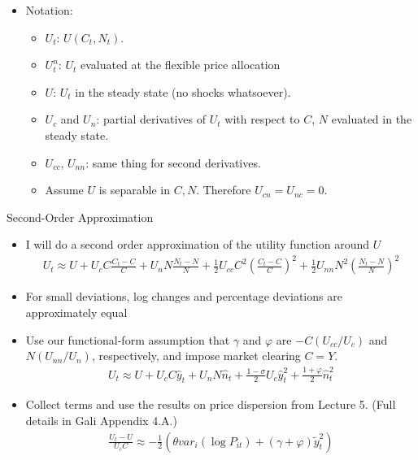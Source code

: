\documentclass[11pt,aspectratio=169,xcolor={dvipsnames},hyperref={pdftex,pdfpagemode=UseNone,hidelinks,pdfdisplaydoctitle=true},usepdftitle=false]{beamer}
\begin{document}
\begin{frame}
\begin{itemize}
\item Notation:
\begin{itemize}
\item $U_t$: $U(C_t,N_t)$.
\item $U_t^n$: $U_t$ evaluated at the flexible price allocation
\item $U$: $U_t$ in the steady state (no shocks whatsoever).
\item $U_c$ and $U_n$: partial derivatives of $U_t$ with respect to $C$, $N$ evaluated in the steady state. 
\item $U_{cc}$, $U_{nn}$: same thing for second derivatives.
\item Assume $U$ is separable in $C,N$. Therefore $U_{cn} = U_{nc} = 0$.
\end{itemize}
\end{itemize}
\end{frame}


\begin{frame}{Second-Order Approximation}
\begin{itemize}
\item I will do a second order approximation of the utility function around $U$
\begin{align*}
U_t \approx U + U_c C \frac{C_t - C}{C} + U_n N \frac{N_t - N}{N} + \frac{1}{2} U_{cc} C^2 \left(\frac{C_t - C}{C}\right)^2 + \frac{1}{2} U_{nn} N^2 \left(\frac{N_t - N}{N}\right)^2 
\end{align*}
\item For small deviations, log changes and percentage deviations are approximately equal
\item Use our functional-form assumption that $\gamma$ and $\varphi$ are $-C (U_{cc}/U_c)$ and $N (U_{nn}/U_n)$, respectively, and impose market clearing $C = Y$.
\begin{align*}
U_t \approx U + U_c C \hat{y}_t + U_n N \hat{n}_t + \frac{1-\sigma}{2} U_{c}  \hat{y}^2_t + \frac{1+\varphi}{2} \hat{n}^2_t
\end{align*}
\item Collect terms and use the results on price dispersion from Lecture 5. (Full details in Gali Appendix 4.A.)
\begin{align*}
\frac{U_t - U}{U_c C} \approx -\frac{1}{2} \left(\theta var_i ( \log P_{it}) + (\gamma + \varphi) \tilde{y}^2_t \right)
\end{align*}
\end{itemize}
\end{frame}
\end{document}
